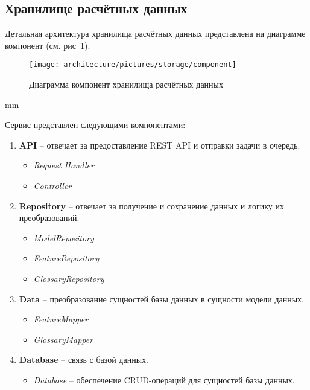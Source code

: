 \subsection{\large{Хранилище расчётных данных}}

Детальная архитектура хранилища расчётных данных представлена на диаграмме компонент
(см. рис\ \ref{pic:architecture__storage-component}).

\begin{figure}[H]
	\hspace*{-2.5 cm}\texttt{[image: architecture/pictures/storage/component]}
	\caption{Диаграмма компонент хранилища расчётных данных}
	\label{pic:architecture__storage-component}
\end{figure}
 mm


Сервис представлен следующими компонентами:
\begin{enumerate}
	\item {
		\textbf{API} -- отвечает за предоставление REST API и отправки задачи в очередь.
		\begin{itemize}
			\item \textit{Request Handler}
			\item \textit{Controller}
		\end{itemize}
	}
	\item {
		\textbf{Repository} -- отвечает за получение и сохранение данных и логику их преобразований.
		\begin{itemize}
			\item \textit{ModelRepository}
			\item \textit{FeatureRepository}
			\item \textit{GlossaryRepository}
		\end{itemize}
	}
	\item {
		\textbf{Data} -- преобразование сущностей базы данных в сущности модели данных.
		\begin{itemize}
			\item \textit{FeatureMapper}
			\item \textit{GlossaryMapper}
		\end{itemize}
	}
	\item {
		\textbf{Database} -- связь с базой данных.
		\begin{itemize}
			\item \textit{Database} -- обеспечение CRUD-операций для сущностей базы данных.
		\end{itemize}
	}
\end{enumerate}